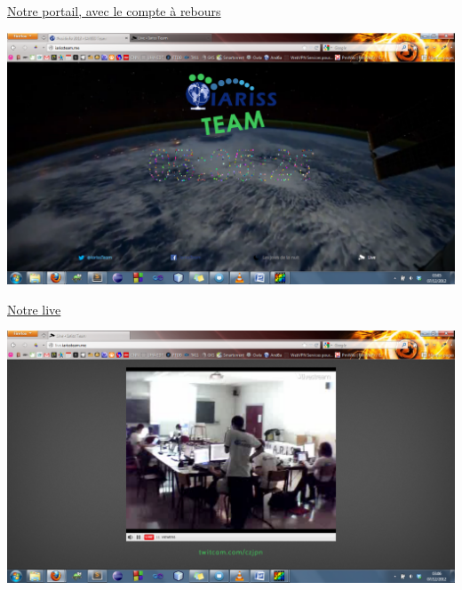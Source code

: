 \documentclass[12pt, a4paper]{article}
\newcommand{\espace}{\vspace{.8cm}}
\begin{document}
\href{http://iarissteam.me/}{Notre portail, avec le compte à rebours}
\espace{}
\begin{center}
\includegraphics[width=.9\textwidth, keepaspectratio=true]{img/portail.png}
\end{center}
\espace{}

\href{http://live.iarissteam.me/}{Notre live}
\espace{}
\begin{center}
\includegraphics[width=.9\textwidth, keepaspectratio=true]{img/live.png}
\end{center}
\espace{}
\end{document}
